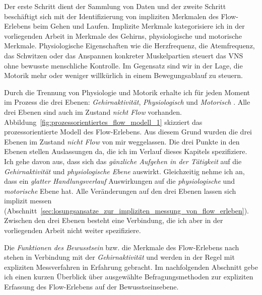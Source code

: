 Der erste Schritt dient der Sammlung von Daten und der zweite Schritt beschäftigt sich mit der Identifizierung von impliziten Merkmalen des Flow-Erlebens beim Gehen und Laufen. Implizite Merkmale kategorisiere ich in der vorliegenden Arbeit in Merkmale des Gehirns, physiologische und motorische Merkmale. Physiologische Eigenschaften wie die Herzfrequenz, die Atemfrequenz, das Schwitzen oder das Anspannen konkreter Muskelpartien steuert das \acs{VNS} ohne bewusste menschliche Kontrolle. Im Gegensatz sind wir in der Lage, die Motorik mehr oder weniger willkürlich in einem Bewegungsablauf zu steuern. 

Durch die Trennung von Physiologie und Motorik erhalte ich für jeden Moment im Prozess die drei Ebenen: \emph{Gehirnaktivität}, \emph{Physiologisch} und \emph{Motorisch} \citep[][S.~15]{Grueter2016a}. Alle drei Ebenen sind auch im Zustand \emph{nicht Flow} vorhanden. Abbildung~\ref{fig:prozessorientiertes_flow_modell_1} skizziert das prozessorientierte Modell des Flow-Erlebens. Aus diesem Grund wurden die drei Ebenen im Zustand \emph{nicht Flow} von mir weggelassen. Die drei Punkte in den Ebenen stellen Auslassungen da, die ich im Verlauf dieses Kapitels spezifiziere. Ich gehe davon aus, dass sich das \emph{gänzliche Aufgehen in der Tätigkeit} auf die \emph{Gehirnaktivität} und \emph{physiologische Ebene} auswirkt. Gleichzeitig nehme ich an, dass ein \emph{glatter Handlungsverlauf} Auswirkungen auf die \emph{physiologische} und \emph{motorische} Ebene hat. Alle Veränderungen auf den drei Ebenen lassen sich implizit messen (Abschnitt~\ref{sec:losungsansatze_zur_impliziten_messung_von_flow_erleben}). Zwischen den drei Ebenen besteht eine Verbindung, die ich aber in der vorliegenden Arbeit nicht weiter spezifiziere. 

Die \emph{Funktionen des Bewusstsein} bzw. die Merkmale des Flow-Erlebens nach \citet{Henk2014} stehen in Verbindung mit der \emph{Gehirnaktivität} und werden in der Regel mit expliziten Messverfahren in Erfahrung gebracht. Im nachfolgenden Abschnitt gebe ich einen kurzen Überblick über ausgewählte Befragungsmethoden zur expliziten Erfassung des Flow-Erlebens auf der Bewusstseinsebene. 

